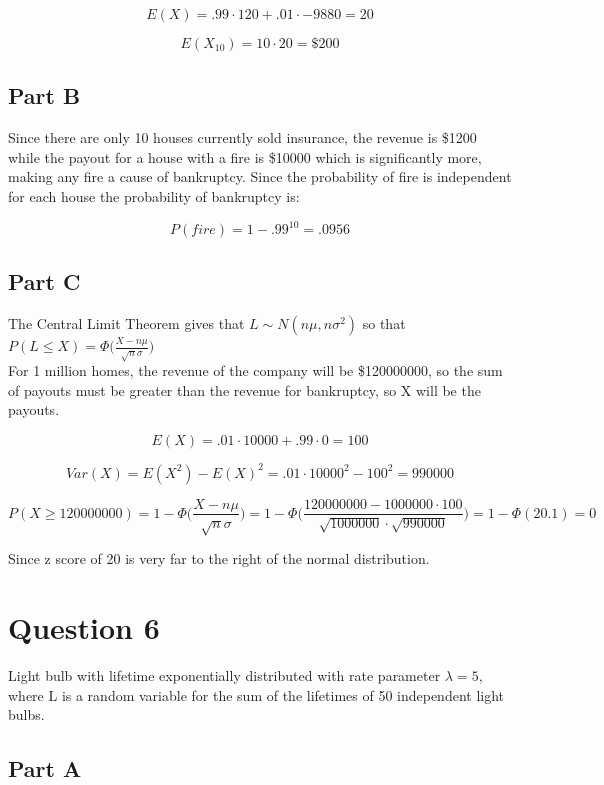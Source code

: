 \documentclass[letterpaper]{article}
\begin{document}
$$E(X) = .99 \cdot 120 + .01 \cdot -9880 = 20$$

$$E(X_{10}) = 10 \cdot 20 = \$200$$

\subsection*{Part B}

Since there are only 10 houses currently sold insurance, the revenue is \$1200 while the payout for a house with a fire is \$10000 which is significantly more, making any fire a cause of bankruptcy. Since the probability of fire is independent for each house the probability of bankruptcy is:

$$P(fire) = 1 - .99^{10} = .0956$$

\subsection*{Part C}

The Central Limit Theorem gives that $L \sim N(n\mu, n\sigma^2)$ so that $P(L \leq X) = \Phi \Big( \frac{X - n\mu}{\sqrt{n}\sigma} \Big)$\\

\noindent For 1 million homes, the revenue of the company will be \$120000000, so the sum of payouts must be greater than the revenue for bankruptcy, so X will be the payouts.

$$E(X) = .01 \cdot 10000 + .99 \cdot 0 = 100$$

$$Var(X) = E(X^2) - E(X)^2 = .01 \cdot 10000^2 - 100^2 = 990000$$

$$P(X \geq 120000000) = 1 - \Phi \Big( \frac{X - n\mu}{\sqrt{n}\sigma} \Big) = 1 - \Phi \Big( \frac{120000000 - 1000000 \cdot 100}{\sqrt{1000000} \cdot \sqrt{990000}} \Big) = 1 - \Phi (20.1) = 0$$

\noindent Since z score of 20 is very far to the right of the normal distribution.

\newpage

\section*{Question 6}

Light bulb with lifetime exponentially distributed with rate parameter $\lambda = 5$, where L is a random variable for the sum of the lifetimes of 50 independent light bulbs.

\subsection*{Part A}
\end{document}
